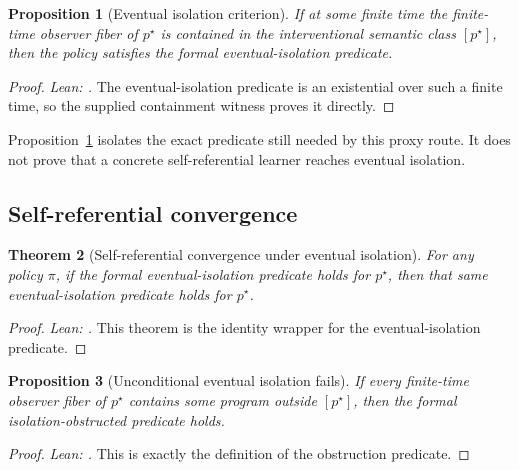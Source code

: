 \documentclass[11pt]{article}
\newtheorem{theorem}{Theorem}[section]
\newtheorem{proposition}[theorem]{Proposition}
\theoremstyle{definition}
\theoremstyle{remark}
\theoremstyle{plain}
\theoremstyle{definition}
\begin{document}
\begin{proposition}[Eventual isolation criterion]
\label{prop:observer-promotion-sr}
If at some finite time the finite-time observer fiber of $p^\star$ is contained in the interventional semantic class $[p^\star]$, then the policy satisfies the formal eventual-isolation predicate.
\end{proposition}

\begin{proof}
\noindent\emph{Lean: .}
The eventual-isolation predicate is an existential over such a finite time, so the supplied containment witness proves it directly.
\end{proof}

Proposition~\ref{prop:observer-promotion-sr} isolates the exact predicate still needed by this proxy route. It does not prove that a concrete self-referential learner reaches eventual isolation.

\subsection{Self-referential convergence}
\label{sec:self-ref-convergence}

\begin{theorem}[Self-referential convergence under eventual isolation]
\label{thm:self-ref-convergence}
For any policy $\pi$, if the formal eventual-isolation predicate holds for $p^\star$, then that same eventual-isolation predicate holds for $p^\star$.
\end{theorem}

\begin{proof}
\noindent\emph{Lean: .}
This theorem is the identity wrapper for the eventual-isolation predicate.
\end{proof}

\begin{proposition}[Unconditional eventual isolation fails]
\label{prop:self-ref-obstruction}
If every finite-time observer fiber of $p^\star$ contains some program outside $[p^\star]$, then the formal isolation-obstructed predicate holds.
\end{proposition}

\begin{proof}
\noindent\emph{Lean: .}
This is exactly the definition of the obstruction predicate.
\end{proof}
\end{document}
